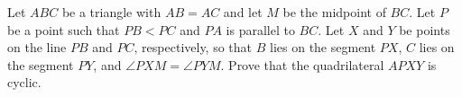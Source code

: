 Let $ABC$ be a triangle with $AB=AC$ and let $M$ be the midpoint of $BC$.
Let $P$ be a point such that $PB<PC$ and $PA$ is parallel to $BC$.
Let $X$ and $Y$ be points on the line $PB$ and $PC$, respectively,
so that $B$ lies on the segment $PX$, $C$ lies on the segment $PY$, and $\angle PXM=\angle PYM$.
Prove that the quadrilateral $APXY$ is cyclic.
